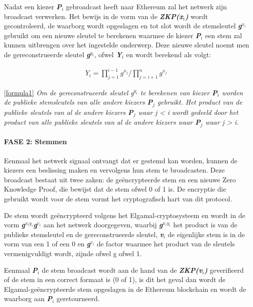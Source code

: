 			Nadat een kiezer \textbf{\textit{P$_{i}$}}  gebroadcast heeft naar Ethereum zal het netwerk zijn broadcast verwerken. Het bewijs in de vorm van de \textbf{\textit{ZKP(x$_{i}$)}} wordt gecontroleerd, de waarborg wordt opgeslagen en tot slot wordt de  stemsleutel \textbf{\textit{g$^{x_{i}}$}} gebruikt om een nieuwe sleutel te berekenen waarmee de kiezer \textbf{\textit{P$_{i}$}} een stem zal kunnen uitbrengen over het ingestelde onderwerp. Deze nieuwe sleutel noemt men de gereconstrueerde sleutel \textbf{\textit{g$^{y_{i}}$}}, ofwel \textbf{\textit{Y$_{i}$}} en wordt berekend als volgt: 
			\begin{ceqn}
				\begin{align}
					Y_{i} = \prod_{j=1}^{i-1}g^{x_{j}}  / \prod_{j=i+1}^{n}g^{x_{j}} \label{formula1}\
				\end{align}
			\end{ceqn}
			
			\eqref{formula1} \textit{Om de gereconstrueerde sleutel g$^{y_{i}}$ te berekenen van kiezer \textbf{P$_{i}$} worden de publieke stemsleutels van alle andere kiezers \textbf{P$_{j}$} gebruikt. Het product van de publieke sleutels van al de andere kiezers \textbf{P$_{j}$} waar j < i wordt gedeeld door het product van alle publieke sleutels van al de andere kiezers waar \textbf{P$_{j}$} waar  j > i.}
			
			\paragraph*{FASE 2: Stemmen}
			Eenmaal het netwerk signaal ontvangt dat er gestemd kan worden, kunnen de kiezers een beslissing maken en vervolgens hun stem te broadcasten. Deze broadcast bestaat uit twee zaken: de geëncrypteerde stem en een nieuwe Zero Knowledge Proof, die bewijst dat de stem ofwel 0 of 1 is. De encryptie die gebruikt wordt voor de stem vormt het cryptografisch hart van dit protocol. 
			
			De stem wordt geëncrypteerd volgens het Elgamal-cryptosysteem en wordt in de vorm  \textbf{\textit{g$^{x_{i}y_{i}}$g$^{v_{i}}$}} aan het netwerk doorgegeven,  waarbij  \textbf{\textit{g$^{x_{i}y_{i}}$}} het product is van de publieke stemsleutel en de gereconstrueerde sleutel, \textbf{\textit{v$_{i}$}} de eigenlijke stem is in de vorm van een 1 of een 0 en \textbf{\textit{g$^{v_{i}}$}} de factor waarmee het product van de sleutels vermenigvuldigt wordt, zijnde ofwel g ofwel 1. 
			
			Eenmaal \textbf{\textit{P$_{i}$}} de stem broadcast wordt aan de hand van de \textbf{\textit{ZKP(v$_{i}$)}} geverifieerd of de stem in een correct formaat is (0 of 1), is dit het geval dan wordt de Elgamal-geëncrypteerde stem opgeslagen in de Ethereum blockchain en wordt de waarborg aan \textbf{\textit{P$_{i}$}} geretourneerd.
			

